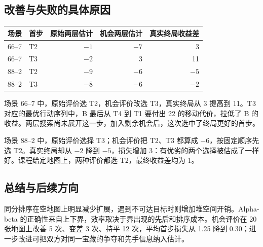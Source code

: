 \documentclass[UTF8,a4paper,10pt,fontset=fandol]{ctexart}
\begin{document}
\subsection{改善与失败的具体原因}
\begin{center}\small
{}
\begin{tabular}{llrrr}
\toprule 场景 & 首步 & 原始两层估计 & 机会两层估计 & 真实终局收益差\\\midrule
66--7&T2&$-1$&$-7$&3\\
66--7&T3&$-2$&3&11\\
88--2&T2&$-9$&$-6$&$-5$\\
88--2&T3&$-8$&$-6$&$-2$\\\bottomrule
\end{tabular}\end{center}

场景 66--7 中，原始评价选 T2，机会评价改选 T3，真实终局从 3 提高到 11。T3 对应的最优行动序列中，B 最后从 T4 到 T1 要付出 22 的移动代价，拉低了 B 的收益。两层搜索尚未展开这一步，加入剩余机会后，这次选中了终局更好的首步。

场景 88--2 中，原始评价选择 T3；机会评价把 T2、T3 都算成 $-6$，按固定顺序先选 T2。真实终局却从 $-2$ 降到 $-5$，损失增加 3：有优劣的两个选择被估成了一样好。课程给定地图上，两种评价都选 T2，最终收益差均为 1。

\subsection{总结与后续方向}
同分排序在空地图上明显减少扩展，遇到不可达目标时则增加堆空间开销。Alpha-beta 的正确性来自上下界，效率取决于界出现的先后和排序成本。机会评价在 20 张地图上改善 5 次、变差 3 次、持平 12 次，平均首步损失从 1.25 降到 0.30；进一步改进可把双方对同一宝藏的争夺和先手信息纳入估计。
\end{document}
